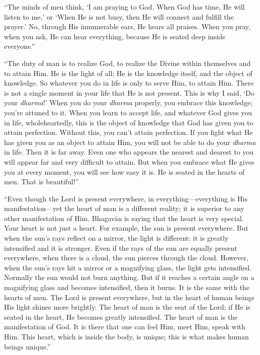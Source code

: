 \enquote{The minds of men think, \enquote{I am praying to God. When God has time, He will listen to me,} or \enquote{When He is not busy, then He will connect and fulfill the prayer.} No, through His innumerable ears, He hears all praises. When you pray, when you ask, He can hear everything, because He is seated deep inside everyone.}

\enquote{The duty of man is to realize God, to realize the Divine within themselves and to attain Him. He is the light of all; He is the knowledge itself, and the object of knowledge. So whatever you do in life is only to serve Him, to attain Him. There is not a single moment in your life that He is not present. This is why I said, \enquote{Do your \textit{dharma}!} When you do your \textit{dharma} properly, you embrace this knowledge; you’re attuned to it. When you learn to accept life, and whatever God gives you in life, wholeheartedly, this is the object of knowledge that God has given you to attain perfection. Without this, you can’t attain perfection. If you fight what He has given you as an object to attain Him, you will not be able to do your \textit{dharma} in life. Then it is far away. Even one who appears the nearest and dearest to you will appear far and very difficult to attain. But when you embrace what He gives you at every moment, you will see how easy it is. He is seated in the hearts of men. That is beautiful!}

\enquote{Even though the Lord is present everywhere, in everything---everything is His manifestation---yet the heart of man is a different reality; it is superior to any other manifestation of Him. Bhagavān is saying that the heart is very special. Your heart is not just a heart. For example, the sun is present everywhere. But when the sun’s rays reflect on a mirror, the light is different: it is greatly intensified and it is stronger. Even if the rays of the sun are equally present everywhere, when there is a cloud, the sun pierces through the cloud. However, when the sun’s rays hit a mirror or a magnifying glass, the light gets intensified. Normally the sun would not burn anything. But if it reaches a certain angle on a magnifying glass and becomes intensified, then it burns. It is the same with the hearts of men. The Lord is present everywhere, but in the heart of human beings His light shines more brightly. The heart of man is the seat of the Lord; if He is seated in the heart, He becomes greatly intensified. The heart of man is the manifestation of God. It is there that one can feel Him, meet Him, speak with Him. This heart, which is inside the body, is unique; this is what makes human beings unique.}

